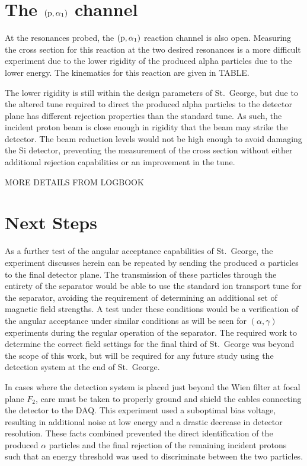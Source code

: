 \section{The $({\rm p},\alpha_1)$ channel}
\label{sec:the-palpha_1-channel}

At the resonances probed, the $({\rm p},\alpha_1)$ reaction channel is
also open. Measuring the cross section for this reaction at the two
desired resonances is a more difficult experiment due to the lower
rigidity of the produced alpha particles due to the lower energy. The
kinematics for this reaction are given in TABLE.

The lower rigidity is still within the design parameters of St.\ George,
but due to the altered tune required to direct the produced alpha
particles to the detector plane has different rejection properties than
the standard tune. As such, the incident proton beam is close enough in
rigidity that the beam may strike the detector. The beam reduction
levels would not be high enough to avoid damaging the Si detector,
preventing the measurement of the cross section without either
additional rejection capabilities or an improvement in the tune.

MORE DETAILS FROM LOGBOOK


\section{Next Steps}
\label{sec:next-steps}

As a further test of the angular acceptance capabilities of St.\ George,
the experiment discusses herein can be repeated by sending the produced
$\alpha$ particles to the final detector plane. The transmission of
these particles through the entirety of the separator would be able to
use the standard ion transport tune for the separator, avoiding the
requirement of determining an additional set of magnetic field
strengths. A test under these conditions would be a verification of the
angular acceptance under similar conditions as will be seen for
$(\alpha,\gamma)$ experiments during the regular operation of the
separator. The required work to determine the correct field settings for
the final third of St.\ George was beyond the scope of this work, but
will be required for any future study using the detection system at the
end of St.\ George.

In cases where the detection system is placed just beyond the Wien
filter at focal plane $F_2$, care must be taken to properly ground and
shield the cables connecting the detector to the DAQ. This experiment
used a suboptimal bias voltage, resulting in additional noise at low
energy and a drastic decrease in detector resolution. These facts
combined prevented the direct identification of the produced $\alpha$
particles and the final rejection of the remaining incident protons such
that an energy threshold was used to discriminate between the two
particles.



